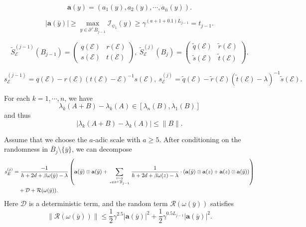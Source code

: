\documentclass[10pt,a4paper]{amsart}
\newcommand{\barB}{\overline{B}}
\newcommand{\bfa}{\mathbf{a}}
\newcommand{\mcD}{\mathcal{D}}
\newcommand{\mcE}{\mathcal{E}}
\newcommand{\mcI}{\mathcal{I}}
\newcommand{\mcR}{\mathcal{R}}
\newcommand{\smallSjminusone}{s^{(j-1)}}
\newcommand{\smallSj}{s^{(j)}}
\newcommand{\whn}{\widehat{n}}
\newcommand{\wtSjminusone}{\widetilde{S}^{(j-1)}}
\newcommand{\wtSj}{\widetilde{S}^{(j)}}
\begin{document}
\begin{equation}\label{define vector bfa(y)}
  \mathbf{a}(y)=(a_1(y),a_2(y),\cdots,a_{\whn}(y)).
\end{equation}

\begin{equation}\label{transversality of norm of bfa}
  |\bfa(\bar{y})| \geq \max_{y\in \partial ^+\barB_{j-1}} \mcI_{\psi_1} (y)  \geq \gamma^{(a+1+0.1)L_{j-1}}=t_{j-1}.
\end{equation}

\begin{equation}\label{eigenbasis block form}
\wtSjminusone_{\mcE}(B_{j-1}) = \begin{pmatrix}
q(\mcE) & r(\mcE) \\
s(\mcE) & t(\mcE)
\end{pmatrix}, \ 
\wtSj_{\mcE} (B_{j}) = \begin{pmatrix}
\tilde{q}(\mcE) & \tilde{r}(\mcE) \\
\tilde{s}(\mcE) & \tilde{t}(\mcE)
\end{pmatrix}.
\end{equation}

\begin{equation}\label{eigenbasis schur complement}
   \smallSjminusone_{\mcE}=q(\mcE)-r(\mcE)(t(\mcE)-\mcE)^{-1} s(\mcE) ,\ \smallSj_{\mcE}=\tilde{q}(\mcE)-\tilde{r}(\mcE)(\tilde{t}(\mcE)-\lambda)^{-1}\tilde{s}(\mcE).
\end{equation}

\begin{cor}\label{Spectral stability lemma}
For each \(k = 1, \cdots, n\), we have
\[
\lambda_k(A + B) - \lambda_k(A) \in [\lambda_n(B), \lambda_1(B)]
\]
and thus 
\[
|\lambda_k(A + B) - \lambda_k(A)| \leq \|B\|.
\]
\end{cor}

\begin{lem}\label{key decomposition lemma}
   Assume that we choose the $a$-adic scale with $a\geq 5$. After conditioning on the randomness in $\barB_{j}\setminus \{\bar{y}\}$, we can decompose 
  {\small
  \begin{align*}
    \smallSj_E & = \frac{-1}{h+2d+\beta \omega(\bar{y})-\lambda}\left(\bfa(\bar{y})\otimes \bfa(\bar{y})+ \sum_{z\sim \bar{y} \atop z\in \partial^+\barB_{j-1}} \frac{1}{h+2d+\beta\omega(z)-\lambda } \cdot(\bfa(\bar{y}) \otimes  \bfa(z)+\bfa(z)\otimes\bfa(\bar{y})  )\right) \\
    \notag & \ \ \ + \mcD + \mcR(\omega(\bar{y})) .
  \end{align*}
  }
  Here $\mcD$ is a deterministic term, and the random term $\mcR(\omega(\bar{y}))$ satisfies
  \begin{equation}\label{estimate on mcR}
    \|\mcR(\omega(\bar{y}))\| \leq \frac{1}{2}\gamma^{2.5} |\bfa(\bar{y})|^2 + \frac{1}{2}\gamma^{0.5L_{j-1}} |\bfa(\bar{y})|^2.
  \end{equation}
\end{lem}
\end{document}
